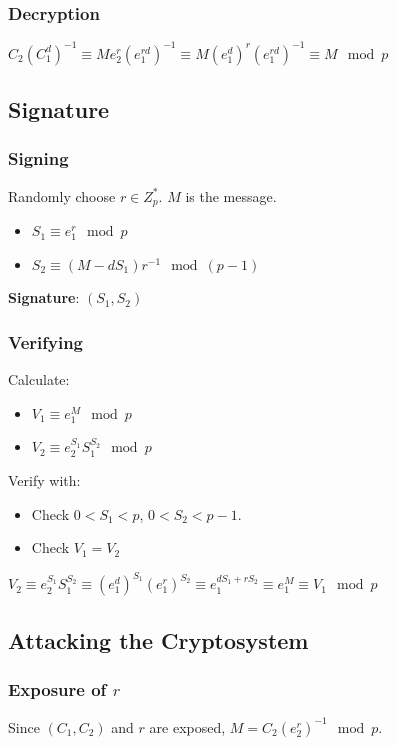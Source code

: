 \documentclass{report}
\begin{document}
			\subsubsection{Decryption}
				$C_2(C_1^d)^{-1} \equiv Me_2^r(e_1^{rd})^{-1} \equiv M(e_1^d)^r(e_1^{rd})^{-1} \equiv M \mod p$
		
		\subsection{Signature}
			\subsubsection{Signing}
				Randomly choose $r \in Z_p^*$. $M$ is the message.
				\begin{itemize}
					\item $S_1 \equiv e_1^r \mod p$
					\item $S_2 \equiv (M-dS_1)r^{-1} \mod (p-1)$
				\end{itemize}
				\textbf{Signature}: $(S_1,S_2)$
			
			\subsubsection{Verifying}
				Calculate:
				\begin{itemize}
					\item $V_1 \equiv e_1^M \mod p$
					\item $V_2 \equiv e_2^{S_1}S_1^{S_2} \mod p$
				\end{itemize}
				Verify with:
				\begin{itemize}
					\item Check $0<S_1<p$, $0<S_2<p-1$.
					\item Check $V_1=V_2$
				\end{itemize}
				\begin{math}
				V_2 \equiv e_2^{S_1}S_1^{S_2} \equiv (e_1^d)^{S_1}(e_1^r)^{S_2} \equiv e_1^{dS_1+rS_2} \equiv e_1^M \equiv V_1 \mod p
				\end{math}
		
		\subsection{Attacking the Cryptosystem}
			\subsubsection{Exposure of $r$}
				Since $(C_1,C_2)$ and $r$ are exposed, $M=C_2(e_2^r)^{-1} \mod p$.
			
\end{document}
